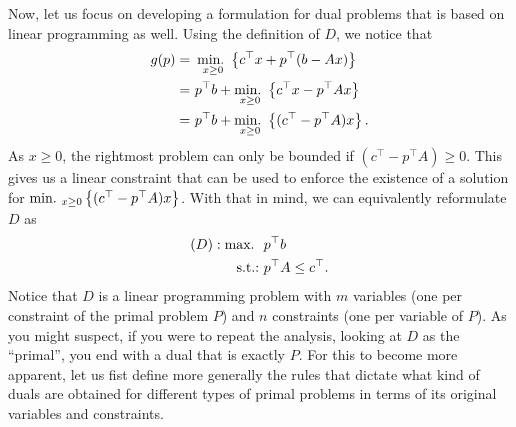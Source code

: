 Now, let us focus on developing a formulation for dual problems that is based on linear programming as well. Using the definition of $D$, we notice that
%
\begin{align*}
	g(p) = \ & \mathop{\text{min.~}}_{x \geq 0}  \left\{ c^\top x + p^\top (b - Ax) \right \}	\\
	= \ & p^\top b + \mathop{\text{min.~}}_{x \geq 0}  \left\{ c^\top x - p^\top Ax \right \}    \\
    = \ & p^\top b + \mathop{\text{min.~}}_{x \geq 0}  \left\{ (c^\top - p^\top A)x \right \}.  
\end{align*} 
%
As $x \ge 0$, the rightmost problem can only be bounded if $(c^\top - p^\top A) \ge 0$. This gives us a linear constraint that can be used to enforce the existence of a solution for $\mathop{\text{min.~}}_{x \geq 0}  \left\{ (c^\top - p^\top A)x \right \}$. With that in mind, we can equivalently reformulate $D$ as
%
\begin{align*}
	(D) : \mathop{\text{max.~}} \ & p^\top b \\
	\mathop{\text{s.t.:~}} 	  & p^\top A \leq c^\top.
\end{align*}	
%
Notice that $D$ is a linear programming problem with $m$ variables (one per constraint of the primal problem $P$) and $n$ constraints (one per variable of $P$). As you might suspect, if you were to repeat the analysis, looking at $D$ as the ``primal'', you end with a dual that is exactly $P$. For this to become more apparent, let us fist define more generally the rules that dictate what kind of duals are obtained for different types of primal problems in terms of its original variables and constraints. 


